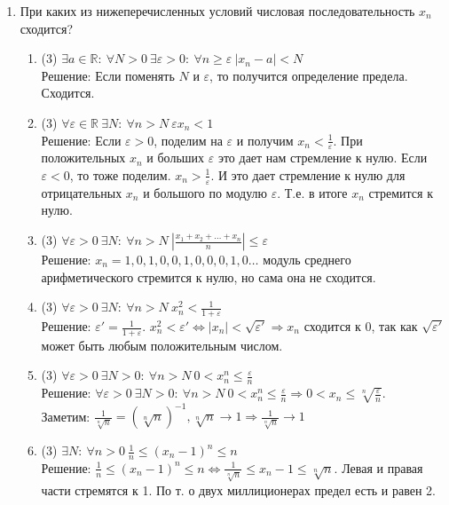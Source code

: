\documentclass[a4paper]{article}
\def\eps{\varepsilon}
\begin{document}
\begin{enumerate}
	\item При каких из нижеперечисленных условий числовая последовательность $x_n$ сходится?
	\begin{enumerate}
	    \item (3) $\exists a\in \mathbb R:\ \forall N>0\ \exists \eps>0:\ \forall n\geq\eps\ |x_n - a|<N$\\
        Решение: Если поменять $N$ и $\eps$, то получится определение предела. Сходится.
	    \item (3) $\forall \eps\in \mathbb R\ \exists N:\ \forall n>N\ \eps x_n < 1$\\
	    Решение: Если $\eps > 0$, поделим на $\eps$ и получим $x_n < \frac{1}{\eps}$. При положительных $x_n$ и больших $\eps$ это дает нам стремление к нулю. Если $\eps < 0$, то тоже поделим. $x_n > \frac{1}{\eps}$. И это дает стремление к нулю для отрицательных $x_n$ и большого по модулю $\eps$. Т.е. в итоге $x_n$ стремится к нулю.
	    \item (3) $\forall \eps>0\ \exists N:\ \forall n>N\ \left|\frac{x_1+x_2+\dots + x_n}{n}\right|\leq \eps$\\
	    Решение: $x_n = 1, 0, 1, 0, 0, 1, 0, 0, 0, 1, 0 \dots$ модуль среднего арифметического стремится к нулю, но сама она не сходится.
	    \item (3) $\forall \eps>0\ \exists N:\ \forall n>N\ x_n^2<\frac{1}{1+\eps}$\\
        Решение: $\eps' = \frac{1}{1+\eps}$. $x_n^2 < \eps' \Leftrightarrow |x_n| < \sqrt{\eps'} \Rightarrow x_n$ сходится к 0, так как $\sqrt{\eps'}$ может быть любым положительным числом.
        \item (3) $\forall\eps>0\ \exists N>0:\ \forall n>N\ 0<x_n^n\leq \frac{\eps}{n}$\\
	    Решение: $\forall\eps>0\ \exists N>0:\ \forall n>N\ 0<x_n^n\leq \frac{\eps}{n} \Rightarrow 0<x_n \leq \sqrt[n]{\frac{\eps}{n}}$.\\
	    Заметим: $\frac{1}{\sqrt[n]{n}} = (\sqrt[n]{n})^{-1}, \sqrt[n]{n} \rightarrow 1 \Rightarrow \frac{1}{\sqrt[n]{n}} \rightarrow 1$
        \item (3) $\exists N:\ \forall n>0\ \frac{1}{n}\leq (x_n - 1)^n \leq n$\\
        Решение: $\frac{1}{n}\leq (x_n - 1)^n \leq n \Leftrightarrow \frac{1}{\sqrt[n]{n}} \le x_n - 1 \le \sqrt[n]{n}$. Левая и правая части стремятся к 1. По т. о двух миллиционерах предел есть и равен 2.
	\end{enumerate}
    

\end{enumerate}
\end{document}
